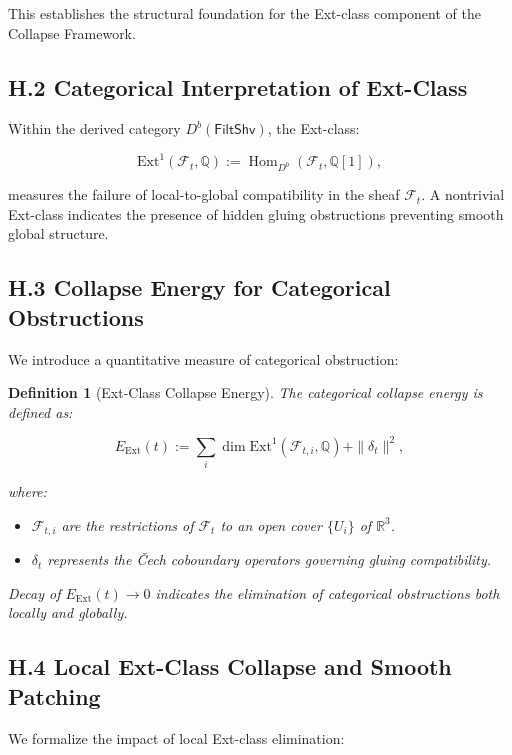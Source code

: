 \documentclass[11pt]{article}
\newtheorem{definition}[theorem]{Definition}
\begin{document}
This establishes the structural foundation for the Ext-class component of the Collapse Framework.

\subsection*{H.2 Categorical Interpretation of Ext-Class}

Within the derived category \( D^b(\mathsf{FiltShv}) \), the Ext-class:

\[
\mathrm{Ext}^1(\mathcal{F}_t, \mathbb{Q}) := \operatorname{Hom}_{D^b}(\mathcal{F}_t, \mathbb{Q}[1]),
\]

measures the failure of local-to-global compatibility in the sheaf \( \mathcal{F}_t \).  
A nontrivial Ext-class indicates the presence of hidden gluing obstructions preventing smooth global structure.

\subsection*{H.3 Collapse Energy for Categorical Obstructions}

We introduce a quantitative measure of categorical obstruction:

\begin{definition}[Ext-Class Collapse Energy]
The categorical collapse energy is defined as:

\[
E_{\mathrm{Ext}}(t) := \sum_i \dim \mathrm{Ext}^1(\mathcal{F}_{t, i}, \mathbb{Q}) + \| \delta_t \|^2,
\]

where:

\begin{itemize}
  \item \( \mathcal{F}_{t, i} \) are the restrictions of \( \mathcal{F}_t \) to an open cover \( \{ U_i \} \) of \( \mathbb{R}^3 \).
  \item \( \delta_t \) represents the Čech coboundary operators governing gluing compatibility.
\end{itemize}

Decay of \( E_{\mathrm{Ext}}(t) \to 0 \) indicates the elimination of categorical obstructions both locally and globally.
\end{definition}

\subsection*{H.4 Local Ext-Class Collapse and Smooth Patching}

We formalize the impact of local Ext-class elimination:
\end{document}
